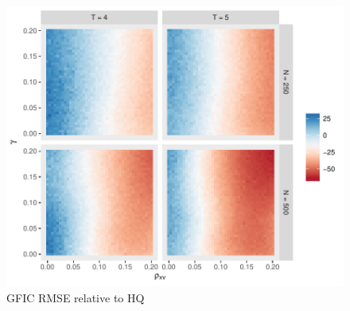 \begin{figure}
\centering
\includegraphics[scale = 0.8]{./simulations/DynamicPanel/results/Dpanel_GFIC_RMSE_rel_HQ}
\caption{GFIC RMSE relative to HQ}
\end{figure}

